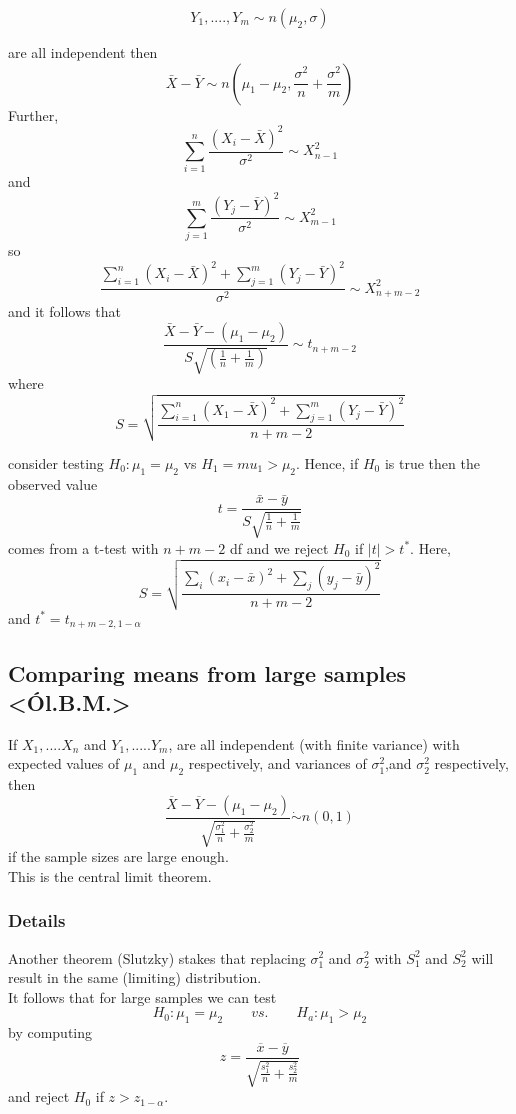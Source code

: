 \documentclass[12pt,a4paper]{article}
\theoremstyle{regla}
\theoremstyle{remark}
\theoremstyle{definition}
\theoremstyle{nonumberbreak}
\begin{document}
$$Y_1, ...., Y_m \sim n(\mu_2,\sigma)$$

 
are all independent then
$$\bar{X}-\bar{Y} \sim n(\mu_1-\mu_2,\frac{\sigma^2}{n}+\frac{\sigma^2}{m})$$
Further,
$$\sum_{i=1}^{n} \frac{(X_i-\bar{X})^2}{\sigma^2} \sim X_{n-1}^{2}$$
and
$$\sum_{j=1}^{m} \frac{(Y_j-\bar{Y})^2}{\sigma^2} \sim X_{m-1}^{2}$$
so
$$\frac {\sum_{i=1}^{n}(X_i-\bar{X})^2 + \sum_{j=1}^{m}(Y_j-\bar{Y})^2}{\sigma^2} \sim X_{n+m-2}^2$$
and it follows that
$$\frac {\bar{X}-\bar{Y}-(\mu_1-\mu_2)}{S\sqrt{(\frac{1}{n}+\frac{1}{m})}} \sim t_{n+m-2}$$
where
$$S=\sqrt{\frac{\sum_{i=1}^{n}(X_1-\bar{X})^2+\sum_{j=1}^{m}(Y_j-\bar{Y})^2}{n+m-2}}$$

consider testing $H_0:\mu_1=\mu_2$ vs $H_1=mu_1>\mu_2$. Hence, if $H_0$ is true then the observed value
$$t=\frac{\bar{x}-\bar{y}}{S\sqrt{\frac{1}{n}+\frac{1}{m}}}$$
comes from a t-test with $n+m-2$ df and we reject $H_0$ if $\left|t\right|>t^*$. Here,
$$S=\sqrt{\frac{\sum_{i}(x_i-\bar{x})^2+\sum_{j}(y_j-\bar{y})^2}{n+m-2}}$$
and $t^*=t_{n+m-2,1-\alpha}$


\subsection{Comparing means from large samples <Ól.B.M.>}
\begin{fbox}
\begin{minipage}{0.97\textwidth}
If $X_1,....X_n$ and $Y_1,.....Y_m$, are all independent (with finite variance) with expected values of $\mu_1$ and $\mu_2$ respectively, and variances of $\sigma_1^2$,and $\sigma_2^2$ respectively, then 
$$\frac{\overline{X}-\overline{Y}-(\mu_1-\mu_2)}{\sqrt{\frac{\sigma_1^2}{n}+\frac{\sigma_2^2}{m}}} \dot{\sim}n(0,1)$$
if the sample sizes are large enough.\\

This is the central limit theorem.
\end{minipage}
\end{fbox}
\subsubsection{Details}
Another theorem (Slutzky) stakes that replacing $\sigma_1^2$ and $\sigma_2^2$ with $S_1^2$ and $S_2^2$ will result in the same (limiting) distribution.\\

It follows that for large samples we can test
$$H_0: \mu_1=\mu_2 \qquad vs. \qquad H_a:\mu_1 > \mu_2$$
by computing $$z=\frac{\overline{x}-\overline{y}}{\sqrt{\frac{s_1^2}{n}+\frac{s_2^2}{m}}}$$
and reject $H_0$ if $z>z_{1-\alpha}$.
\end{document}
